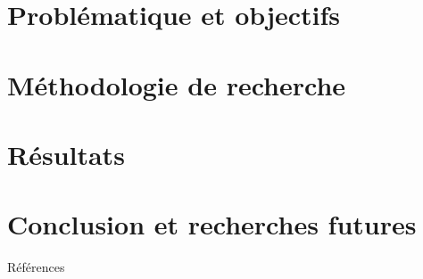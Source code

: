 \documentclass[xcolor={table,usenames,dvipsnames}]{beamer}
\begin{document}


\section[Objectifs]{Problématique et objectifs}

%




\section[Méthodologie]{Méthodologie de recherche}
%

%

%

%
%
\section[Résultats]{Résultats}
\section[Conclusion]{Conclusion et recherches futures}
%

%


\begin{frame}[allowframebreaks]{Références}
\printbibliography

\end{frame}
\end{document}
